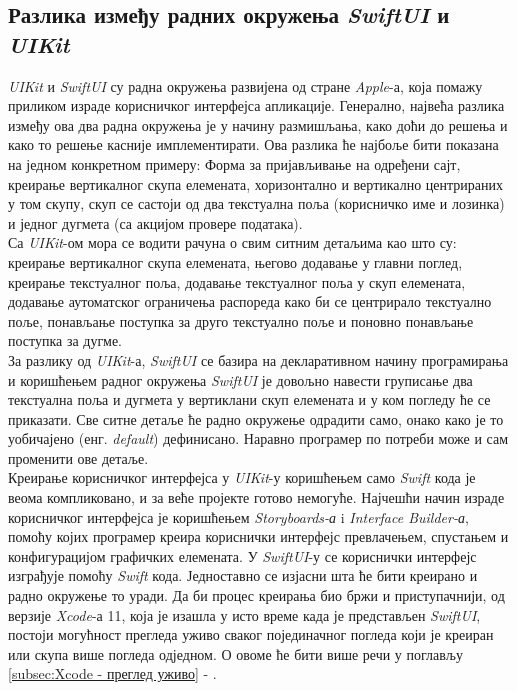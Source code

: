 \documentclass[12pt,oneside]{memoir}
\begin{document}
\subsection{Разлика између радних окружења \textit{SwiftUI} и \textit{UIKit}}
\label{subsec:Разлика SwiftUI и UIKit}

\indent \textit{UIKit} и \textit{SwiftUI} су радна окружења развијена од стране \textit{Apple}-а, која помажу приликом израде корисничког интерфејса апликације. Генерално, највећа разлика између ова два радна окружења је у начину размишљања, како доћи до решења и како то решење касније имплементирати. Ова разлика ће најбоље бити показана на једном конкретном примеру: Форма за пријављивање на одређени сајт, креирање вертикалног скупа елемената, хоризонтално и вертикално центрираних у том скупу, скуп се састоји од два текстуална поља (корисничко име и лозинка) и једног дугмета (са акцијом провере података).
\\
\indent Са \textit{UIKit}-ом мора се водити рачуна о свим ситним детаљима као што су: креирање вертикалног скупа елемената, његово додавање у главни поглед, креирање текстуалног поља, додавање текстуалног поља у скуп елемената, додавање аутоматског ограничења распореда како би се центрирало текстуално поље, понављање поступка за друго текстуално поље и поновно понављање поступка за дугме. 
\\
\indent За разлику од \textit{UIKit}-а, \textit{SwiftUI} се базира на декларативном начину програмирања и коришћењем радног окружења \textit{SwiftUI} је довољно навести груписање два текстуална поља и дугмета у вертиклани скуп елемената и у ком погледу ће се приказати. Све ситне детаље ће радно окружење одрадити само, онако како је то уобичајено (енг. \textit{default}) дефинисано. Наравно програмер по потреби може и сам променити ове детаље.
\\
\indent Креирање корисничког интерфејса у \textit{UIKit}-у коришћењем само \textit{Swift} кода је веома компликовано, и за веће пројекте готово немогуће. Најчешћи начин израде корисничког интерфејса је коришћењем \textit{Storyboards-а} i \textit{Interface Builder-а}, помоћу којих програмер креира кориснички интерфејс превлачењем, спустањем и конфигурацијом графичких елемената. У \textit{SwiftUI}-у се кориснички интерфејс изграђује помоћу \textit{Swift} кода. Једноставно се изјасни шта ће бити креирано и радно окружење то уради. Да би процес креирања био бржи и приступачнији, од верзије \textit{Xcode}-а 11, која је изашла у исто време када је представљен \textit{SwiftUI}, постоји могућност прегледа уживо сваког појединачног погледа који је креиран или скупа више погледа одједном. О овоме ће бити више речи у поглављу \ref{subsec:Xcode - преглед уживо} - .
\end{document}
